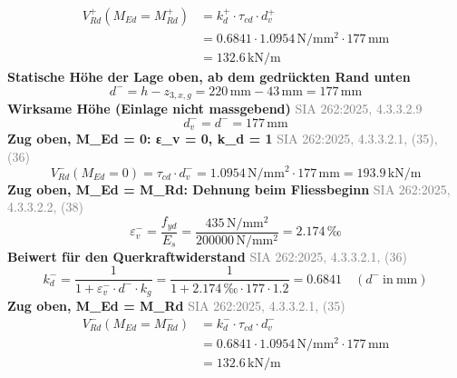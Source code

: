\documentclass[11pt,a4paper]{article}
\newcommand{\normref}[1]{{\small\textcolor{gray}{#1}}}
\begin{document}
\begin{equation*}
\begin{aligned}
  V_{Rd}^{+}(M_{Ed} = M_{Rd}^{+}) &= k_d^{+} \cdot \tau_{cd} \cdot d_v^{+} \\
  &= 0.6841 \cdot 1.0954\,\mathrm{N}/\mathrm{mm}^{2} \cdot 177\,\mathrm{mm} \\
  &= 132.6\,\mathrm{kN}/\mathrm{m}
\end{aligned}
\end{equation*}
\noindent\textbf{Statische Höhe der Lage oben, ab dem gedrückten Rand unten}
\begin{equation*}
d^{-} = h - z_{3,x,g} = 220\,\mathrm{mm} - 43\,\mathrm{mm} = 177\,\mathrm{mm}
\end{equation*}
\noindent\textbf{Wirksame Höhe (Einlage nicht massgebend)} \hfill \normref{SIA 262:2025, 4.3.3.2.9}
\begin{equation*}
d_v^{-} = d^{-} = 177\,\mathrm{mm}
\end{equation*}
\noindent\textbf{Zug oben, M\_Ed = 0: ε\_v = 0, k\_d = 1} \hfill \normref{SIA 262:2025, 4.3.3.2.1, (35), (36)}
\begin{equation*}
V_{Rd}^{-}(M_{Ed} = 0) = \tau_{cd} \cdot d_v^{-} = 1.0954\,\mathrm{N}/\mathrm{mm}^{2} \cdot 177\,\mathrm{mm} = 193.9\,\mathrm{kN}/\mathrm{m}
\end{equation*}
\noindent\textbf{Zug oben, M\_Ed = M\_Rd: Dehnung beim Fliessbeginn} \hfill \normref{SIA 262:2025, 4.3.3.2.2, (38)}
\begin{equation*}
\varepsilon_v^{-} = \frac{f_{yd}}{E_s} = \frac{435\,\mathrm{N}/\mathrm{mm}^{2}}{200000\,\mathrm{N}/\mathrm{mm}^{2}} = 2.174\,\text{‰}
\end{equation*}
\noindent\textbf{Beiwert für den Querkraftwiderstand} \hfill \normref{SIA 262:2025, 4.3.3.2.1, (36)}
\begin{equation*}
k_d^{-} = \frac{1}{1 + \varepsilon_v^{-} \cdot d^{-} \cdot k_g} = \frac{1}{1 + 2.174\,\text{‰} \cdot 177 \cdot 1.2} = 0.6841 \quad \left(d^{-}\ \text{in}\ \mathrm{mm}\right)
\end{equation*}
\noindent\textbf{Zug oben, M\_Ed = M\_Rd} \hfill \normref{SIA 262:2025, 4.3.3.2.1, (35)}
\begin{equation*}
\begin{aligned}
  V_{Rd}^{-}(M_{Ed} = M_{Rd}^{-}) &= k_d^{-} \cdot \tau_{cd} \cdot d_v^{-} \\
  &= 0.6841 \cdot 1.0954\,\mathrm{N}/\mathrm{mm}^{2} \cdot 177\,\mathrm{mm} \\
  &= 132.6\,\mathrm{kN}/\mathrm{m}
\end{aligned}
\end{equation*}
\end{document}
